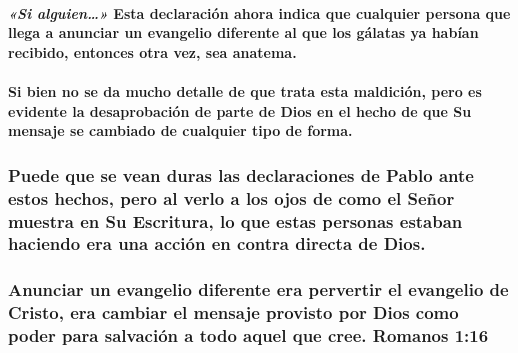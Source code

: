 \documentclass[11a pt,twoside]{article}
\newcommand{\scripture}[1]{%
  {\fontsize{12pt}{16pt}\selectfont\ScriptureFont\itshape #1}%
}
\def\textbf#1{#1}%
\let\oldsubsubsection\subsubsection
\renewcommand{\subsubsection}{\needspace{4\baselineskip}\oldsubsubsection}
\let\oldparagraph\paragraph
\renewcommand{\paragraph}{\needspace{3\baselineskip}\oldparagraph}
\begin{document}
\paragraph{\texorpdfstring{\scripture{«Si alguien…»} Esta declaración
ahora indica que cualquier persona que llega a anunciar un evangelio
diferente al que los gálatas ya habían recibido, entonces otra vez, sea
anatema.}{ Esta declaración ahora indica que cualquier persona que llega a anunciar un evangelio diferente al que los gálatas ya habían recibido, entonces otra vez, sea anatema.}}\label{si-alguien-esta-declaraciuxf3n-ahora-indica-que-cualquier-persona-que-llega-a-anunciar-un-evangelio-diferente-al-que-los-guxe1latas-ya-habuxedan-recibido-entonces-otra-vez-sea-anatema.}

\paragraph{Si bien no se da mucho detalle de que trata esta maldición,
pero es evidente la desaprobación de parte de Dios en el hecho de que Su
mensaje se cambiado de cualquier tipo de
forma.}\label{si-bien-no-se-da-mucho-detalle-de-que-trata-esta-maldiciuxf3n-pero-es-evidente-la-desaprobaciuxf3n-de-parte-de-dios-en-el-hecho-de-que-su-mensaje-se-cambiado-de-cualquier-tipo-de-forma.}

\subsubsection{Puede que se vean duras las declaraciones de Pablo ante
estos hechos, pero al verlo a los ojos de como el Señor muestra en Su
Escritura, lo que estas personas estaban haciendo era una acción en
contra directa de
Dios.}\label{puede-que-se-vean-duras-las-declaraciones-de-pablo-ante-estos-hechos-pero-al-verlo-a-los-ojos-de-como-el-seuxf1or-muestra-en-su-escritura-lo-que-estas-personas-estaban-haciendo-era-una-acciuxf3n-en-contra-directa-de-dios.}

\subsubsection{\texorpdfstring{Anunciar un evangelio diferente era
pervertir el \textbf{evangelio de Cristo}, era cambiar el mensaje
provisto por Dios como poder para salvación a todo aquel que cree.
Romanos
1:16}{Anunciar un evangelio diferente era pervertir el evangelio de Cristo, era cambiar el mensaje provisto por Dios como poder para salvación a todo aquel que cree. Romanos 1:16}}\label{anunciar-un-evangelio-diferente-era-pervertir-el-evangelio-de-cristo-era-cambiar-el-mensaje-provisto-por-dios-como-poder-para-salvaciuxf3n-a-todo-aquel-que-cree.-romanos-116}
\end{document}
